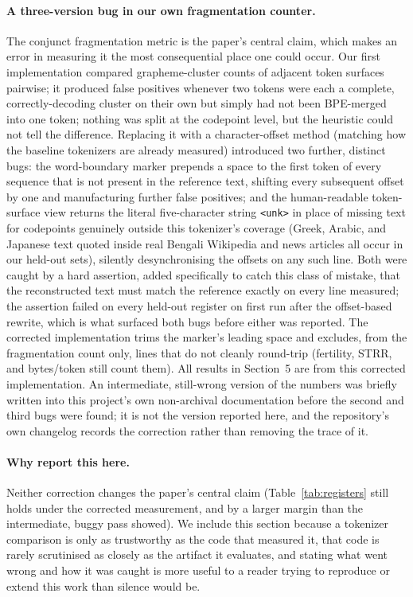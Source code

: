 \documentclass[11pt]{article}
\begin{document}
\paragraph{A three-version bug in our own fragmentation counter.} The
conjunct fragmentation metric is the paper's central claim, which makes an
error in measuring it the most consequential place one could occur. Our first
implementation compared grapheme-cluster counts of adjacent token surfaces
pairwise; it produced false positives whenever two tokens were each a
complete, correctly-decoding cluster on their own but simply had not been
BPE-merged into one token; nothing was split at the codepoint level, but the
heuristic could not tell the difference. Replacing it with a character-offset
method (matching how the baseline tokenizers are already measured) introduced
two further, distinct bugs: the word-boundary marker prepends a space to the
first token of every sequence that is not present in the reference text,
shifting every subsequent offset by one and manufacturing further false
positives; and the human-readable token-surface view returns the literal
five-character string \texttt{<unk>} in place of missing text for codepoints
genuinely outside this tokenizer's coverage (Greek, Arabic, and Japanese text
quoted inside real Bengali Wikipedia and news articles all occur in our
held-out sets), silently desynchronising the offsets on any such line. Both
were caught by a hard assertion, added specifically to catch this class of
mistake, that the reconstructed text must match the reference exactly on every
line measured; the assertion failed on every held-out register on first run
after the offset-based rewrite, which is what surfaced both bugs before either
was reported. The corrected implementation trims the marker's leading space
and excludes, from the fragmentation count only, lines that do not cleanly
round-trip (fertility, STRR, and bytes/token still count them). All results in
Section~5 are from this corrected implementation. An intermediate, still-wrong
version of the numbers was briefly written into this project's own
non-archival documentation before the second and third bugs were found; it is
not the version reported here, and the repository's own changelog records the
correction rather than removing the trace of it.

\paragraph{Why report this here.} Neither correction changes the paper's
central claim (Table~\ref{tab:registers} still holds under the corrected
measurement, and by a larger margin than the intermediate, buggy pass showed).
We include this section because a tokenizer comparison is only as trustworthy
as the code that measured it, that code is rarely scrutinised as closely as
the artifact it evaluates, and stating what went wrong and how it was caught
is more useful to a reader trying to reproduce or extend this work than
silence would be.
\end{document}
